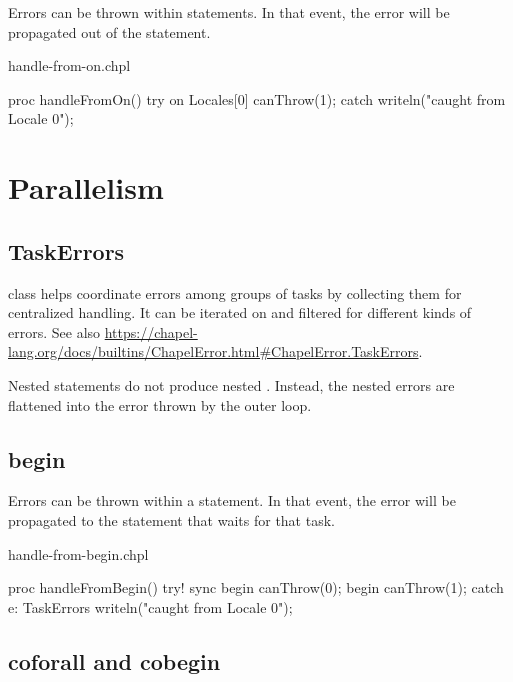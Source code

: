 Errors can be thrown within  statements. In that event, the error
will be propagated out of the  statement.

\begin{chapelexample}{handle-from-on.chpl}
\begin{chapel}
proc handleFromOn() {
  try {
    on Locales[0] {
      canThrow(1);
    }
  } catch {
    writeln("caught from Locale 0");
  }
}
\end{chapel}
\end{chapelexample}


\section{Parallelism}
\label{Errors_Parallelism}

\subsection{TaskErrors}
\label{TaskErrors}

 class helps coordinate errors among groups of tasks by collecting
them for centralized handling. It can be iterated on and filtered for
different kinds of errors. See also
\url{https://chapel-lang.org/docs/builtins/ChapelError.html#ChapelError.TaskErrors}.

Nested  statements do not produce nested .
Instead, the nested errors are flattened into the  error
thrown by the outer loop.

\subsection{begin}
\label{Errors_begin}

Errors can be thrown within a  statement. In that event, the error
will be propagated to the  statement that waits for that task.

\begin{chapelexample}{handle-from-begin.chpl}
\begin{chapel}
proc handleFromBegin() {
  try! {
    sync {
      begin canThrow(0);
      begin canThrow(1);
    }
  } catch e: TaskErrors {
    writeln("caught from Locale 0");
  }
}
\end{chapel}
\end{chapelexample}

\subsection{coforall and cobegin}
\label{Errors_coforall_and_cobegin}

